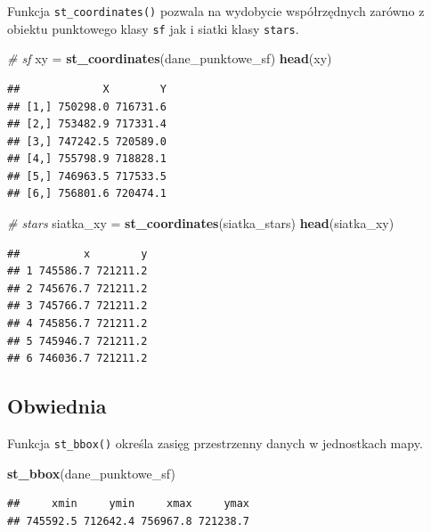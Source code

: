 \documentclass[
  paper=6in:9in,pagesize=pdftex,headinclude=on,footinclude=on,10pt]{scrbook}
\newenvironment{Shaded}{\begin{snugshade}}{\end{snugshade}}
\newcommand{\CommentTok}[1]{\textcolor[rgb]{0.56,0.35,0.01}{\textit{#1}}}
\newcommand{\FunctionTok}[1]{\textcolor[rgb]{0.13,0.29,0.53}{\textbf{#1}}}
\newcommand{\NormalTok}[1]{#1}
\newcommand{\OtherTok}[1]{\textcolor[rgb]{0.56,0.35,0.01}{#1}}
\begin{document}
Funkcja \texttt{st\_coordinates()} pozwala na wydobycie współrzędnych zarówno z obiektu punktowego klasy \texttt{sf} jak i siatki klasy \texttt{stars}.

\begin{Shaded}
\begin{Highlighting}[]
\CommentTok{\# sf}
\NormalTok{xy }\OtherTok{=} \FunctionTok{st\_coordinates}\NormalTok{(dane\_punktowe\_sf)}
\FunctionTok{head}\NormalTok{(xy)}
\end{Highlighting}
\end{Shaded}

\begin{verbatim}
##             X        Y
## [1,] 750298.0 716731.6
## [2,] 753482.9 717331.4
## [3,] 747242.5 720589.0
## [4,] 755798.9 718828.1
## [5,] 746963.5 717533.5
## [6,] 756801.6 720474.1
\end{verbatim}

\begin{Shaded}
\begin{Highlighting}[]
\CommentTok{\# stars}
\NormalTok{siatka\_xy }\OtherTok{=} \FunctionTok{st\_coordinates}\NormalTok{(siatka\_stars)}
\FunctionTok{head}\NormalTok{(siatka\_xy)}
\end{Highlighting}
\end{Shaded}

\begin{verbatim}
##          x        y
## 1 745586.7 721211.2
## 2 745676.7 721211.2
## 3 745766.7 721211.2
## 4 745856.7 721211.2
## 5 745946.7 721211.2
## 6 746036.7 721211.2
\end{verbatim}

\subsection{Obwiednia}\label{obwiednia}

Funkcja \texttt{st\_bbox()} określa zasięg przestrzenny danych w jednostkach mapy.

\begin{Shaded}
\begin{Highlighting}[]
\FunctionTok{st\_bbox}\NormalTok{(dane\_punktowe\_sf)}
\end{Highlighting}
\end{Shaded}

\begin{verbatim}
##     xmin     ymin     xmax     ymax 
## 745592.5 712642.4 756967.8 721238.7
\end{verbatim}
\end{document}
